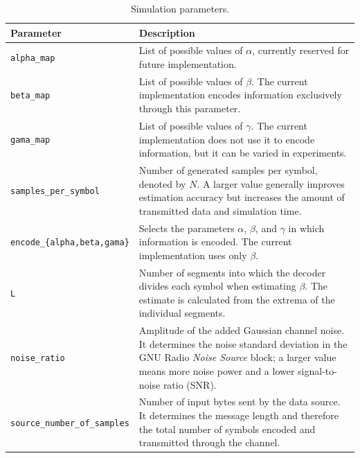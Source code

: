 \documentclass[a4paper, 12pt, openany]{book}
\begin{document}
\begin{table}[H]

\begin{tabular}{|l|p{9cm}|}
\hline
\textbf{Parameter} & \textbf{Description} \\ \hline

\texttt{alpha\_map} &
List of possible values of $\alpha$, currently reserved for future implementation. \\ \hline

\texttt{beta\_map} &
List of possible values of $\beta$. The current implementation encodes information exclusively through this parameter. \\ \hline

\texttt{gama\_map} &
List of possible values of $\gamma$. The current implementation does not use it to encode information, but it can be varied in experiments. \\ \hline

\texttt{samples\_per\_symbol} &
Number of generated samples per symbol, denoted by $N$. A larger value generally improves estimation accuracy but increases the amount of transmitted data and simulation time. \\ \hline

\texttt{encode\_\{alpha,beta,gama\}} &
Selects the parameters $\alpha$, $\beta$, and $\gamma$ in which information is encoded. The current implementation uses only $\beta$. \\ \hline

\texttt{L} &
Number of segments into which the decoder divides each symbol when estimating $\beta$. The estimate is calculated from the extrema of the individual segments. \\ \hline

\texttt{noise\_ratio} &
Amplitude of the added Gaussian channel noise. It determines the noise standard deviation in the GNU Radio \textit{Noise Source} block; a larger value means more noise power and a lower signal-to-noise ratio (SNR)\cite{gnuradioNoiseSource}. \\ \hline

\texttt{source\_number\_of\_samples} &
Number of input bytes sent by the data source. It determines the message length and therefore the total number of symbols encoded and transmitted through the channel. \\ \hline

\end{tabular}
\caption{Simulation parameters.}
\label{tab:parametri}
\end{table}
\end{document}
